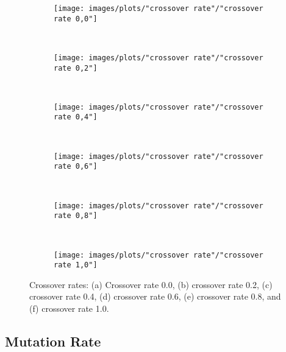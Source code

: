 \documentclass[12pt]{report}
\begin{document}
\begin{figure}[h!]
    \centering
    \begin{subfigure}[b]{0.31\textwidth}
        \texttt{[image: images/plots/"crossover rate"/"crossover rate 0,0"]}
        \caption{}
        \hfill
        \label{plot:crossover rate 0.0}
    \end{subfigure}
    ~
    \begin{subfigure}[b]{0.31\textwidth}
        \texttt{[image: images/plots/"crossover rate"/"crossover rate 0,2"]}
        \caption{}
        \hfill
        \label{plot:two point crossover}
    \end{subfigure}
    ~
       \begin{subfigure}[b]{0.31\textwidth}
        \texttt{[image: images/plots/"crossover rate"/"crossover rate 0,4"]}
        \caption{}
        \hfill
        \label{plot:two point crossover}
    \end{subfigure}
    ~
       \begin{subfigure}[b]{0.31\textwidth}
        \texttt{[image: images/plots/"crossover rate"/"crossover rate 0,6"]}
        \caption{}
        \hfill
        \label{plot:two point crossover}
    \end{subfigure}
    ~
       \begin{subfigure}[b]{0.31\textwidth}
        \texttt{[image: images/plots/"crossover rate"/"crossover rate 0,8"]}
        \caption{}
        \hfill
        \label{plot:two point crossover}
    \end{subfigure}
    ~
    \begin{subfigure}[b]{0.31\textwidth}
        \texttt{[image: images/plots/"crossover rate"/"crossover rate 1,0"]}
        \caption{}
        \hfill
        \label{plot:uniform crossover}
    \end{subfigure}
    \caption{Crossover rates: (a) Crossover rate 0.0, (b) crossover rate 0.2, (c) crossover rate 0.4, (d) crossover rate 0.6, (e) crossover rate 0.8, and (f) crossover rate 1.0.}
    \label{plot:crossover methods}
\end{figure}


\subsection{Mutation Rate}
\end{document}
